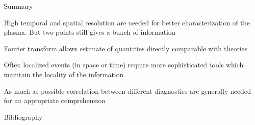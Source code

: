 \documentclass[t,10pt]{beamer}
\begin{document}



\begin{frame}{Summary}
\begin{itemize}
{\large\item High temporal and spatial resolution are needed for better
  characterization of the plasma. But two points still gives a bunch
  of information
\item Fourier transform allows estimate of quantities directly
  comparable with theories
\item Often localized events (in space or time) require more
  sophisticated tools which maintain the locality of the information
\item As much as possible correlation between different diagnostics
  are generally needed for an appropriate comprehension}
\end{itemize}

\end{frame}
\begin{frame}[allowframebreaks]{Bibliography}
\printbibliography
\end{frame}
\end{document}
